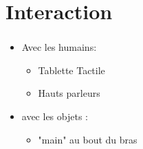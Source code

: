 \section{Interaction}
\begin{frame}
  \frametitle{}
      \begin{itemize}
      \item Avec les humains:
        \begin{itemize}
        \item Tablette Tactile
        \item Hauts parleurs
        \end{itemize}
      \item avec les objets :
	\begin{itemize}
	\item "main" au bout du bras
	\end{itemize}
      \end{itemize}
\end{frame}
